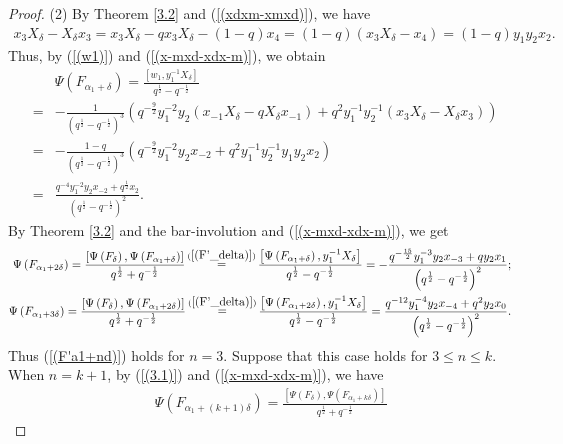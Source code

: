 \documentclass[reqno,11pt]{amsart}
\numberwithin{equation}{section}
\begin{document}
\begin{proof}
(2) By Theorem \ref{3.2} and (\ref{(xdxm-xmxd)}), we have
\begin{eqnarray*}
	x_3 X_\delta-X_\delta x_3  =x_3 X_\delta-q x_3 X_\delta-(1-q) x_4
	 =(1-q)\left(x_3 X_\delta-x_4\right)=(1-q) y_1 y_2 x_2 .
\end{eqnarray*}
Thus, by (\ref{(w1)}) and (\ref{(x-mxd-xdx-m)}), we obtain
\begin{eqnarray*}
	&&\Psi\left(F_{\alpha_1+\delta}\right)  =\frac{\left[w_1, y_1^{-1} X_\delta\right]}{q^{\frac{1}{2}}-q^{-\frac{1}{2}}} \\
	& =&-\frac{1}{\left(q^{\frac{1}{2}}-q^{-\frac{1}{2}}\right)^3}\left(q^{-\frac{9}{2}} y_1^{-2} y_2\left(x_{-1} X_\delta-q X_\delta x_{-1}\right)+q^2 y_1^{-1} y_2^{-1}\left(x_3 X_\delta-X_\delta x_3\right)\right) \\
	& =&-\frac{1-q}{\left(q^{\frac{1}{2}}-q^{-\frac{1}{2}}\right)^3}\left(q^{-\frac{9}{2}} y_1^{-2} y_2 x_{-2}+q^2 y_1^{-1} y_2^{-1} y_1 y_2 x_2\right) \\
	& =&\frac{q^{-4} y_1^{-2} y_2 x_{-2}+q^{\frac{1}{2}} x_2}{\left(q^{\frac{1}{2}}-q^{-\frac{1}{2}}\right)^2} .
\end{eqnarray*}
By Theorem \ref{3.2} and the bar-involution and (\ref{(x-mxd-xdx-m)}), we get
\begin{eqnarray*}
	\Psi\left(F_{\alpha_1+2 \delta}\right)=\frac{{\left[ {\Psi \left( {{F_\delta }} \right),\Psi \left( {{F_{{\alpha _1} + \delta }}} \right)} \right]}}{{{q^{\frac{1}{2}}} + {q^{ - \frac{1}{2}}}}} \mathop  = \limits^{(\ref{(F'_delta)})}\frac{\left[\Psi\left(F_{\alpha_1+\delta}\right), y_1^{-1} X_\delta\right]}{q^{\frac{1}{2}}-q^{-\frac{1}{2}}}=-\frac{q^{-\frac{15}{2}} y_1^{-3} y_2 x_{-3}+q y_2 x_1}{\left(q^{\frac{1}{2}}-q^{-\frac{1}{2}}\right)^2}; \\
	 \Psi\left(F_{\alpha_1+3 \delta}\right)=\frac{{\left[ {\Psi \left( {{F_\delta }} \right),\Psi \left( {{F_{{\alpha _1} +2 \delta }}} \right)} \right]}}{{{q^{\frac{1}{2}}} + {q^{ - \frac{1}{2}}}}} \mathop  = \limits^{(\ref{(F'_delta)})}\frac{\left[\Psi\left(F_{\alpha_1+2 \delta}\right), y_1^{-1} X_\delta\right]}{q^{\frac{1}{2}}-q^{-\frac{1}{2}}}=\frac{q^{-12} y_1^{-4} y_2 x_{-4}+q^2 y_2 x_0}{\left(q^{\frac{1}{2}}-q^{-\frac{1}{2}}\right)^2} .
\end{eqnarray*}
Thus (\ref{(F'a1+nd)}) holds for $n=3$. Suppose that this case holds for $3 \le n \le k$. When $n=k+1$, by (\ref{(3.1)}) and (\ref{(x-mxd-xdx-m)}), we have
\begin{eqnarray*}
	&& \Psi\left(F_{\alpha_1+(k+1) \delta}\right)=\frac{{\left[ {\Psi \left( {{F_\delta }} \right),\Psi \left( {{F_{{\alpha _1} + k\delta }}} \right)} \right]}}{{{q^{\frac{1}{2}}} + {q^{ - \frac{1}{2}}}}}

\end{eqnarray*}
\end{proof}
\end{document}
